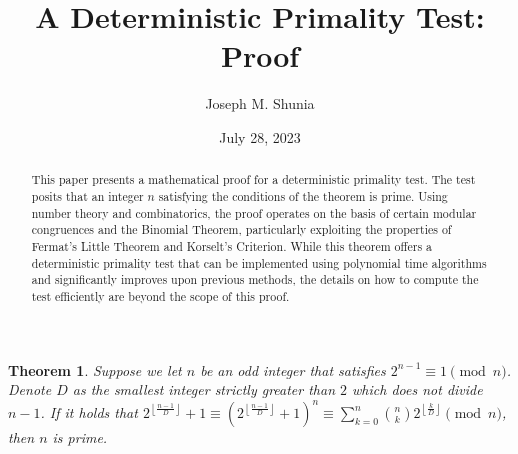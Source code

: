 \documentclass{article}
\title{A Deterministic Primality Test: Proof}
\author{Joseph M. Shunia}
\date{July 28, 2023}
\theoremstyle{plain}
\begin{document}
\maketitle
\begin{abstract}
This paper presents a mathematical proof for a deterministic primality test. The test posits that an integer $n$ satisfying the conditions of the theorem is prime. Using number theory and combinatorics, the proof operates on the basis of certain modular congruences and the Binomial Theorem, particularly exploiting the properties of Fermat's Little Theorem and Korselt's Criterion. While this theorem offers a deterministic primality test that can be implemented using polynomial time algorithms and significantly improves upon previous methods, the details on how to compute the test efficiently are beyond the scope of this proof.
\end{abstract}
\newtheorem*{theorem*}{Theorem}
\begin{theorem*}
Suppose we let $n$ be an odd integer that satisfies $2^{n-1} \equiv 1 \pmod{n}$. Denote $D$ as the smallest integer strictly greater than $2$ which does not divide $n-1$. If it holds that $2^{\left\lfloor \frac{n-1}{D} \right\rfloor} + 1 \equiv (2^{\left\lfloor \frac{n-1}{D} \right\rfloor} + 1)^{n} \equiv \sum_{k=0}^{n} \binom{n}{k}2^{\left\lfloor \frac{k}{D} \right\rfloor} \pmod{n}$, then $n$ is prime.
\end{theorem*}
\end{document}
